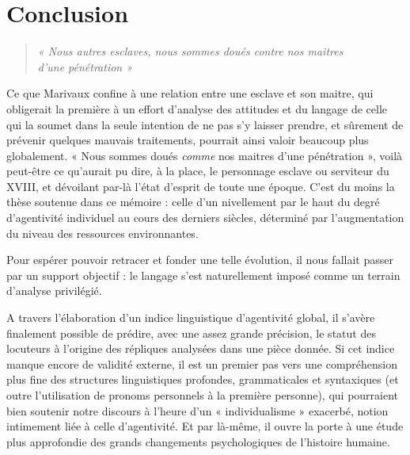 \part*{Conclusion}

\begin{quote}
\textit{ « Nous autres esclaves, nous sommes doués contre nos maitres \\ d’une pénétration »}
\end{quote}

Ce que Marivaux confine à une relation entre une esclave et son maitre, qui obligerait la première à un effort d’analyse des attitudes et du langage de celle qui la soumet dans la seule intention de ne pas s’y laisser prendre, et sûrement de prévenir quelques mauvais traitements, pourrait ainsi valoir beaucoup plus globalement. « Nous sommes doués \textit{comme} nos maitres d’une pénétration », voilà peut-être ce qu’aurait pu dire, à la place, le personnage esclave ou serviteur du XVIII\ieme, et dévoilant par-là l'état d'esprit de toute une époque. C’est du moins la thèse soutenue dans ce mémoire : celle d’un nivellement par le haut du degré d’agentivité individuel au cours des derniers siècles, déterminé par l’augmentation du niveau des ressources environnantes.

Pour espérer pouvoir retracer et fonder une telle évolution, il nous fallait passer par un support objectif : le langage s’est naturellement imposé comme un terrain d’analyse privilégié. 

A travers l’élaboration d’un indice linguistique d’agentivité global, il s’avère finalement possible de prédire, avec une assez grande précision, le statut des locuteurs à l’origine des répliques analysées dans une pièce donnée. Si cet indice manque encore de validité externe, il est un premier pas vers une compréhension plus fine des structures linguistiques profondes, grammaticales et syntaxiques (et outre l’utilisation de pronoms personnels à la première personne), qui pourraient bien soutenir notre discours à l’heure d’un « individualisme » exacerbé, notion intimement liée à celle d’agentivité. Et par là-même, il ouvre la porte à une étude plus approfondie des grands changements psychologiques de l’histoire humaine.

